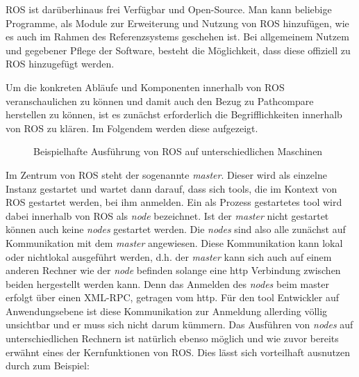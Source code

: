 
\gls{ROS} ist darüberhinaus frei Verfügbar und Open-Source. Man kann beliebige
Programme, als Module zur Erweiterung und Nutzung von \gls{ROS} hinzufügen, wie
es auch im Rahmen des Referenzsystems geschehen ist. Bei allgemeinem Nutzem und
gegebener Pflege der Software, besteht die Möglichkeit, dass diese offiziell zu
ROS hinzugefügt werden.

Um die konkreten Abläufe und Komponenten innerhalb von \gls{ROS}
veranschaulichen zu können und damit auch den Bezug zu Pathcompare herstellen
zu können, ist es zunächst erforderlich die Begrifflichkeiten innerhalb von
\gls{ROS} zu klären. Im Folgendem werden diese aufgezeigt.

\begin{figure}[t]
  \begin{center}
  \end{center}
  \caption{Beispielhafte Ausführung von ROS auf unterschiedlichen Maschinen}
  \label{fig:roscomponents}
\end{figure}

Im Zentrum von ROS steht der sogenannte \textit{master}. Dieser wird als
einzelne Instanz gestartet und wartet dann darauf, dass sich tools, die im
Kontext von \gls{ROS} gestartet werden, bei ihm anmelden. Ein als Prozess
gestartetes tool wird dabei innerhalb von \gls{ROS} als \textit{node}
bezeichnet.  Ist der \textit{master} nicht gestartet können auch keine
\textit{nodes} gestartet werden. Die \textit{nodes} sind also alle zunächst auf
Kommunikation mit dem \textit{master} angewiesen. Diese Kommunikation kann
lokal oder nichtlokal ausgeführt werden, d.h. der \textit{master} kann sich
auch auf einem anderen Rechner wie der \textit{node} befinden solange eine http
Verbindung zwischen beiden hergestellt werden kann. Denn das Anmelden des
\textit{nodes} beim master erfolgt über einen \gls{XML-RPC}, getragen vom http.
Für den tool Entwickler auf Anwendungsebene ist diese Kommunikation zur
Anmeldung allerding völlig unsichtbar und er muss sich nicht darum kümmern.
Das Ausführen von \textit{nodes} auf unterschiedlichen Rechnern ist natürlich
ebenso möglich und wie zuvor bereits erwähnt eines der Kernfunktionen von
\gls{ROS}.  Dies lässt sich vorteilhaft ausnutzen durch zum Beispiel:


